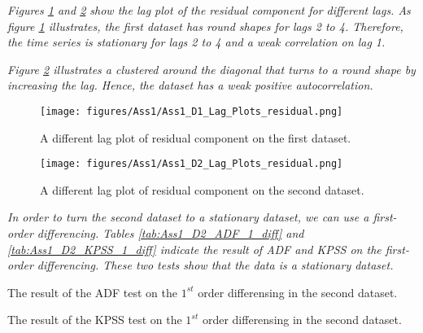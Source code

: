 \textit{Figures \ref{fig:Ass1_D1_Lag_Plots_residual} and \ref{fig:Ass1_D2_Lag_Plots_residual} show the lag plot of the residual component for different lags. As figure \ref{fig:Ass1_D1_Lag_Plots_residual} illustrates, the first dataset has round shapes for lags 2 to 4. Therefore, the time series is stationary for lags 2 to 4 and a weak correlation on lag 1.}

\textit{Figure \ref{fig:Ass1_D2_Lag_Plots_residual} illustrates a clustered around the diagonal that turns to a round shape by increasing the lag. Hence, the dataset has a weak positive autocorrelation. }

\begin{figure}[H]
    \centering
    \begin{minipage}[b]{1\textwidth}
        \texttt{[image: figures/Ass1/Ass1\_D1\_Lag\_Plots\_residual.png]}
    \end{minipage}
    \caption{A different lag plot of residual component on the first dataset.}
    \label{fig:Ass1_D1_Lag_Plots_residual}
\end{figure}

\begin{figure}[H]
    \centering
    \begin{minipage}[b]{1\textwidth}
        \texttt{[image: figures/Ass1/Ass1\_D2\_Lag\_Plots\_residual.png]}
    \end{minipage}
    \caption{A different lag plot of residual component on the second dataset.}
    \label{fig:Ass1_D2_Lag_Plots_residual}
\end{figure}

\textit{In order to turn the second dataset to a stationary dataset, we can use a first-order differencing. Tables \ref{tab:Ass1_D2_ADF_1_diff} and \ref{tab:Ass1_D2_KPSS_1_diff} indicate the result of \gls{ADF} and \gls{KPSS} on the first-order differencing. These two tests show that the data is a stationary dataset.}

\begin{table}[H]
\centering
\caption{The result of the \gls{ADF} test on the $1^{st}$ order differensing in the second dataset.}
\label{tab:Ass1_D2_ADF_1_diff}

\end{table}

\begin{table}[H]
\centering
\caption{The result of the \gls{KPSS} test on the $1^{st}$ order differensing in the second dataset.}
\label{tab:Ass1_D2_KPSS_1_diff}

\end{table}


